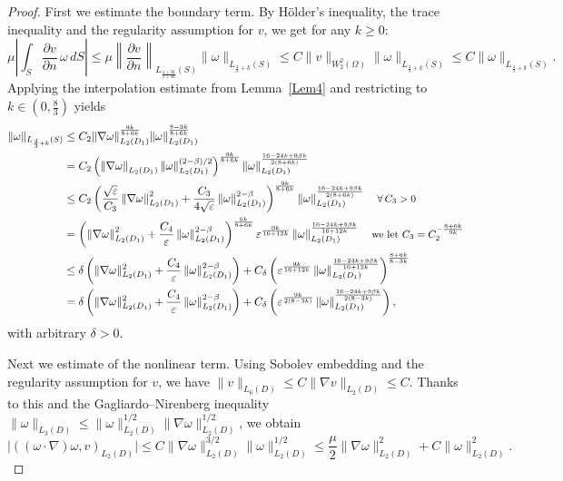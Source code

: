 \documentclass[11pt]{article}
\begin{document}
\begin{proof}
	\medskip
	First we estimate  the boundary term. 
	By Hölder’s inequality, {the trace inequality and the regularity assumption for $v$, we get for any $k\ge0$}:
	\[
	\mu \left| \int_S \frac{\partial v}{\partial n}\,\omega \, dS \right|
	\leq \mu \left\| \frac{\partial v}{\partial n} \right\|_{L_{{\frac{4+3k}{1+3k}}}(S)} \|\omega\|_{L_{{\frac43+k}}(S)}{
	\le C \|v\|_{W^2_2(\Omega)} \|\omega\|_{L_{\frac43+k}(S)} \le 	C \|\omega\|_{L_{\frac43+k}(S)}}.
	\]
	{Applying the interpolation estimate from Lemma~\ref{Lem4} and restricting to  $k\in(0,\frac83)$} yields  
	\[
	\begin{split}
	{ \|\omega\|_{L_{\frac{4}{3}+k}(S)}}& 
	\leq C_2 \|\nabla \omega\|^{\frac{9k}{8+6k}}_{L_2(D_1)} \|\omega\|^{\frac{8-3k}{8+6k}}_{L_2(D_1)}\\
	&= C_2 \left(\left\| \nabla\omega \right\|_{L_2(D_1)} \left\| \omega \right\|^{(2-\beta)/2}_{L_2(D_1)}\right)^{\frac{9k}{8+6k}} \| \omega \|^{\frac{16-24k+9\beta k}{2(8+6k)}}_{L_2 (D_1)}  \\
	&\leq C_2 \left( \frac{\sqrt{\varepsilon}}{C_3} \left\| \nabla\omega \right\|^2_{L_2(D_1)} + \frac{C_3}{4\sqrt{\varepsilon}} \left\| \omega \right\|^{2-\beta}_{L_2(D_1)} \right)^{\frac{9k}{8+6k}} \left\| \omega \right\|^{\frac{16-24k+9\beta k}{2(8+6k)}}_{L_2(D_1)}\quad{\text{\small $\forall\, C_3>0$}}\\
	&= \left( \left\| \nabla\omega \right\|^2_{L_2(D_1)} + \frac{C_4}{\varepsilon} \left\| \omega \right\|^{2-\beta}_{L_2(D_1)} \right)^{\frac{9k}{8+6k}} \varepsilon^{\frac{9k}{16+12k}} \left\| \omega \right\|^{\frac{16-24k+9\beta k}{16+12k}}_{L_2(D_1)} \quad{\text{\small we let $C_3=C_2^{-\frac{8+6k}{9k}}$}} \\
	&\leq \delta \left(  \| \nabla\omega \|^2_{L_2(D_1)} + \frac{C_4}{\varepsilon} \left\| \omega \right\|^{2-\beta}_{L_2(D_1)} \right) + C_{\delta} \left(\varepsilon^{\frac{9k}{16+12k}} \left\| \omega \right\|^{\frac{16-24k+9\beta k}{16+12k}}_{L_2(D_1)}\right)^{\frac{8+6k}{8-3k}}\\
	&=\delta \left(  \| \nabla\omega \|^2_{L_2(D_1)} + \frac{C_4}{\varepsilon} \left\| \omega \right\|^{2-\beta}_{L_2(D_1)} \right) + C_{\delta} \left(\varepsilon^{\frac{9k}{2(8-3k)}} \left\| \omega \right\|^{\frac{16-24k+9\beta k}{2(8-3k)}}_{L_2(D_1)}\right),
	\end{split}
	\]
	with arbitrary $\delta>0$.
	
	\medskip
	Next we estimate of the nonlinear term.
	Using Sobolev embedding {and the regularity assumption for $v$, we have  $\|v\|_{L_6(D)} \le C\|\nabla v\|_{L_2(D)}\le C$. Thanks to this} and the Gagliardo–Nirenberg inequality $\|\omega\|_{L_3(D)} \le \|\omega\|_{L_2(D)}^{1/2}\|\nabla \omega\|_{L_2(D)}^{1/2}$, we obtain
	\[
	\big| ((\omega\cdot\nabla)\omega, v)_{L_2(D)} \big|
	\le C \|\nabla \omega\|_{L_2(D)}^{3/2}\|\omega\|_{L_2(D)}^{1/2}
	\le \frac{\mu}{2}\|\nabla \omega\|_{L_2(D)}^2 + C \|\omega\|_{L_2(D)}^2.
	\]
	

\end{proof}
\end{document}
